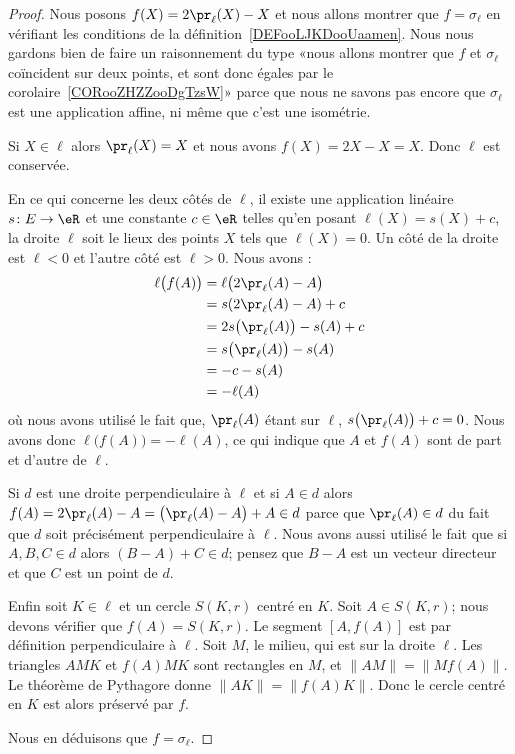 \begin{proof}
	Nous posons \( f(X)=2\pr_{\ell}(X)-X\) et nous allons montrer que \( f=\sigma_{\ell}\) en vérifiant les conditions de la définition~\ref{DEFooLJKDooUaamen}.
	Nous nous gardons bien de faire un raisonnement du type «nous allons montrer que \( f\) et \( \sigma_{\ell}\) coïncident sur deux points, et sont donc égales par le corolaire~\ref{CORooZHZZooDgTzsW}» parce que nous ne savons pas encore que \( \sigma_{\ell}\) est une application affine, ni même que c'est une isométrie.

	Si \( X\in\ell\) alors \( \pr_{\ell}(X)=X\) et nous avons \( f(X)=2X-X=X\). Donc \( \ell\) est conservée.

	En ce qui concerne les deux côtés de \( \ell\), il existe une application linéaire \( s\colon E\to \eR\) et une constante \( c\in \eR\) telles qu'en posant \( \ell(X)=s(X)+c\), la droite \( \ell\) soit le lieux des points \( X\) tels que \( \ell(X)=0\). Un côté de la droite est \( \ell<0\) et l'autre côté est \( \ell>0\). Nous avons :
	\begin{subequations}
		\begin{align}
			\ell\big( f(A) \big) & =\ell\big( 2\pr_{\ell}(A)-A \big)   \\
			                     & =s(2\pr_{\ell}(A)-A)+c              \\
			                     & =2s\big( \pr_{\ell}(A) \big)-s(A)+c \\
			                     & =s\big( \pr_{\ell}(A) \big)-s(A)    \\
			                     & =-c-s(A)                            \\
			                     & =-\ell(A)
		\end{align}
	\end{subequations}
	où nous avons utilisé le fait que, \( \pr_{\ell}(A)\) étant sur \( \ell\), \( s\big( \pr_{\ell}(A) \big)+c=0\). Nous avons donc \( \ell\big( f(A) \big)=-\ell(A)\), ce qui indique que \( A\) et \( f(A)\) sont de part et d'autre de \( \ell\).

	Si \( d\) est une droite perpendiculaire à \( \ell\) et si \( A\in d\) alors \( f(A)=2\pr_{\ell}(A)-A=  \big( \pr_{\ell}(A)-A \big)+A\in d  \) parce que \( \pr_{\ell}(A)\in d\) du fait que \( d\) soit précisément perpendiculaire à \( \ell\). Nous avons aussi utilisé le fait que si \( A,B,C\in d\) alors \( (B-A)+C\in d\); pensez que \( B-A\) est un vecteur directeur et que \( C\) est un point de \( d\).

	Enfin soit \( K\in\ell\) et un cercle \( S(K,r)\) centré en \( K\). Soit \( A\in S(K,r)\); nous devons vérifier que \( f(A)=S(K,r)\). Le segment \( [A,f(A)]\) est par définition perpendiculaire à \( \ell\). Soit \( M\), le milieu, qui est sur la droite \( \ell\). Les triangles \( AMK\) et \( f(A)MK\) sont rectangles en \( M\), et \( \| AM \|=\| Mf(A) \|\). Le théorème de Pythagore donne \( \| AK \|=\| f(A)K \|\). Donc le cercle centré en \( K\) est alors préservé par \( f\).

	Nous en déduisons que \( f=\sigma_{\ell}\).
\end{proof}

